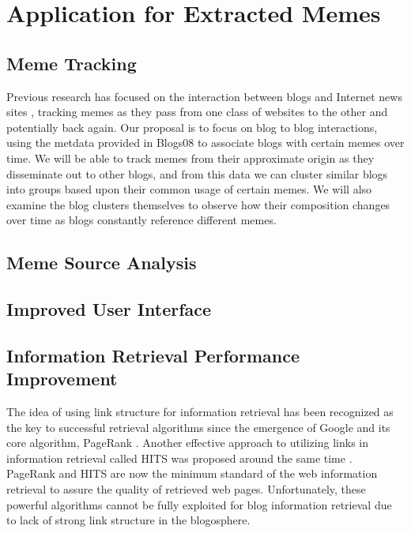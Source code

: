 \documentclass{sig-alternate}
\begin{document}
\section{Application for Extracted Memes}

\subsection{Meme Tracking}

Previous research has focused on the interaction between blogs and Internet news sites \cite{Leskovec2009}, tracking memes as they pass from one class of websites to the other and potentially back again. Our proposal is to focus on blog to blog interactions, using the metdata provided in Blogs08 to associate blogs with certain memes over time.  We will be able to track memes from their approximate origin as they disseminate out to other blogs, and from this data we can cluster similar blogs into groups based upon their common usage of certain memes. We will also examine the blog clusters themselves to observe how their composition changes over time as blogs constantly reference different memes.
 
\subsection{Meme Source Analysis}

\subsection{Improved User Interface}

\subsection{Information Retrieval Performance Improvement}

The idea of using link structure for information retrieval has been recognized as the key to successful retrieval algorithms since the emergence of Google and its core algorithm, PageRank \cite{Brin1998a}. Another effective approach to utilizing links in information retrieval called HITS was proposed around the same time \cite{Kleinberg1999}.  PageRank and HITS are now the minimum standard of the web information retrieval to assure the quality of retrieved web pages. Unfortunately, these powerful algorithms cannot be fully exploited for blog information retrieval due to lack of strong link structure in the blogosphere. 
\end{document}
